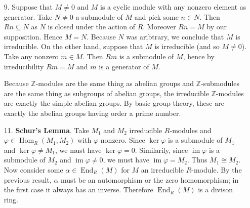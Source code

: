 \documentclass{report}
\DeclareMathOperator{\Hom}{Hom}
\DeclareMathOperator{\End}{End}
\DeclareMathOperator{\im}{im}
\begin{document}
\begin{enumerate}
\item[9.]
Suppose that $M\neq 0$ and $M$ is a cyclic module with any nonzero element as generator. Take $N\neq 0$ a submodule of $M$ and pick some $n\in N$. Then $Rn\subseteq N$ as $N$ is closed under the action of $R$. Moreover $Rn=M$ by our supposition. Hence $M=N$. Because $N$ was aribtrary, we conclude that $M$ is irreducible. On the other hand, suppose that $M$ is irreducible (and so $M\neq 0$). Take any nonzero $m\in M$. Then $Rm$ is a submodule of $M$, hence by irreducibility $Rm=M$ and $m$ is a generator of $M$.

Because $\mathbb{Z}$-modules are the same thing as abelian groups and $\mathbb{Z}$-submodules are the same thing as subgroups of abelian groups, the irreducible $\mathbb{Z}$-modules are exactly the simple abelian groups. By basic group theory, these are exactly the abelian groups having order a prime number.

\item[11.] \textbf{Schur's Lemma}. Take $M_1$ and $M_2$ irreducible $R$-modules and $\varphi\in\Hom_R(M_1,M_2)$ with $\varphi$ nonzero. Since $\ker\varphi$ is a submodule of $M_1$ and $\ker\varphi\neq M_1$, we must have $\ker\varphi=0$. Similarily, since $\im\varphi$ is a submodule of $M_2$ and $\im\varphi\neq 0$, we must have $\im\varphi=M_2$. Thus $M_1\cong M_2$. Now consider some $\alpha\in\End_R(M)$ for $M$ an irreducible $R$-module. By the previous result, $\alpha$ must be an automorphism or the zero homomorphism; in the first case it always has an inverse. Therefore $\End_R(M)$ is a divison ring.
\end{enumerate}
\end{document}
